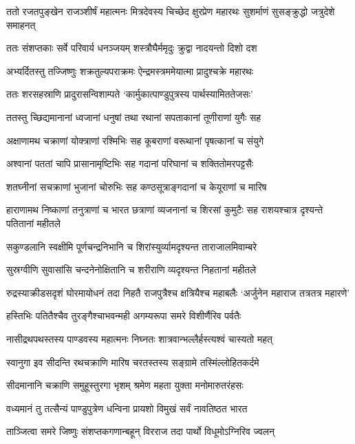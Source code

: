 \threelineshloka
{ततो रजतपुङ्खेन राजञ्शीर्षं महात्मनः}
{मित्रदेवस्य चिच्छेद क्षुरप्रेण महारथः}
{सुशर्माणं सुसङ्क्रुद्धो जत्रुदेशे समाहनत्}


\twolineshloka
{ततः संशप्तकाः सर्वे परिवार्य धनञ्जयम्}
{शस्त्रौघैर्ममृदुः क्रुद्वा नादयन्तो दिशो दश}


\twolineshloka
{अभ्यर्दितस्तु तज्जिष्णुः शक्रतुल्यपराक्रमः}
{ऐन्द्रमस्त्रममेयात्मा प्रादुश्चक्रे महारथः}


\twolineshloka
{ततः शरसहस्राणि प्रादुरासन्विशाम्पते}
{`कार्मुकात्पाण्डुपुत्रस्य पार्थस्यामिततेजसः'}


\twolineshloka
{ततस्तु च्छिद्यमानानां ध्वजानां धनुषां तथा}
{रथानां सपताकानां तूणीराणां युगैः सह}


\twolineshloka
{अक्षाणामथ चक्राणां योक्त्राणां रश्मिभिः सह}
{कूबराणां वरूथानां पृषत्कानां च संयुगे}


\twolineshloka
{अश्वानां पततां चापि प्रासानामृष्टिभिः सह}
{गदानां परिघानां च शक्तितोमरपट्टसैः}


\twolineshloka
{शतघ्नीनां सचक्राणां भुजानां चोरुभिः सह}
{कण्ठसूत्राङ्गदानां च केयूराणां च मारिष}


\threelineshloka
{हाराणामथ निष्काणां तनुत्राणां च भारत}
{छत्राणां व्यजनानां च शिरसां कुमुटैः सह}
{राशयश्चात्र दृश्यन्ते पतितानां महीतले}


\twolineshloka
{सकुण्डलानि स्वक्षीमि पूर्णचन्द्रनिभानि च}
{शिरांस्युर्व्यामदृश्यन्त ताराजालमिवाम्बरे}


\twolineshloka
{सुस्रग्वीणि सुवासांसि चन्दनेनोक्षितानि च}
{शरीराणि व्यदृश्यन्त निहतानां महीतले}


रुद्रस्याक्रीडसदृशं घोरमायोधनं तदा
\twolineshloka
{निहतै राजपुत्रैश्च क्षत्रियैश्च महाबलैः}
{`अर्जुनेन महाराज तत्रतत्र महारणे'}


\twolineshloka
{हस्तिभिः पतितैश्चैव तुरङ्गैश्चाभवन्मही}
{अगम्यरूपा समरे विशीर्णैरिव पर्वतैः}


\twolineshloka
{नासीद्रथपथस्तस्य पाण्डवस्य महात्मनः}
{निघ्नतः शात्रवान्भल्लैर्हस्त्यश्वं चास्यतो महत्}


\twolineshloka
{स्वानुगा इव सीदन्ति रथचक्राणि मारिष}
{चरतस्तस्य सङ्ग्रामे तस्मिंल्लोहितकर्दमे}


\twolineshloka
{सीदमानानि चक्राणि समुहूस्तुरगा भृशम्}
{श्रमेण महता युक्ता मनोमारुतरंहसः}


\twolineshloka
{वध्यमानं तु तत्सैन्यं पाण्डुपुत्रेण धन्विना}
{प्रायशो विमुखं सर्वं नावतिष्ठत भारत}


\twolineshloka
{ताञ्जित्वा समरे जिष्णुः संशप्तकगणान्बहून्}
{विरराज तदा पार्थो विधूमोऽग्निरिव ज्वलन्}


